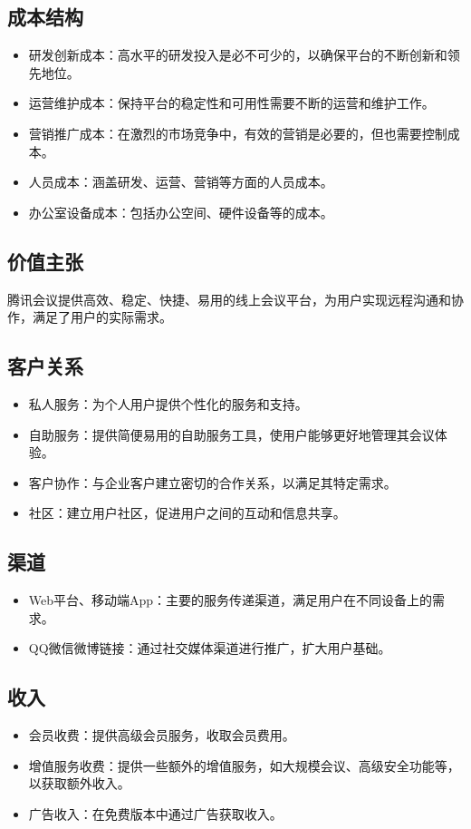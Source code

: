 \documentclass[a4paper,12pt]{article}
\begin{document}
\subsection{成本结构}
\begin{itemize}[label=--, left=0pt]
    \item 研发创新成本：高水平的研发投入是必不可少的，以确保平台的不断创新和领先地位。
    \item 运营维护成本：保持平台的稳定性和可用性需要不断的运营和维护工作。
    \item 营销推广成本：在激烈的市场竞争中，有效的营销是必要的，但也需要控制成本。
    \item 人员成本：涵盖研发、运营、营销等方面的人员成本。
    \item 办公室设备成本：包括办公空间、硬件设备等的成本。
\end{itemize}

\subsection{价值主张}
腾讯会议提供高效、稳定、快捷、易用的线上会议平台，为用户实现远程沟通和协作，满足了用户的实际需求。

\subsection{客户关系}
\begin{itemize}[label=--, left=0pt]
    \item 私人服务：为个人用户提供个性化的服务和支持。
    \item 自助服务：提供简便易用的自助服务工具，使用户能够更好地管理其会议体验。
    \item 客户协作：与企业客户建立密切的合作关系，以满足其特定需求。
    \item 社区：建立用户社区，促进用户之间的互动和信息共享。
\end{itemize}

\subsection{渠道}
\begin{itemize}[label=--, left=0pt]
    \item Web平台、移动端App：主要的服务传递渠道，满足用户在不同设备上的需求。
    \item QQ微信微博链接：通过社交媒体渠道进行推广，扩大用户基础。
\end{itemize}

\subsection{收入}
\begin{itemize}[label=--, left=0pt]
    \item 会员收费：提供高级会员服务，收取会员费用。
    \item 增值服务收费：提供一些额外的增值服务，如大规模会议、高级安全功能等，以获取额外收入。
    \item 广告收入：在免费版本中通过广告获取收入。
\end{itemize}
\end{document}
